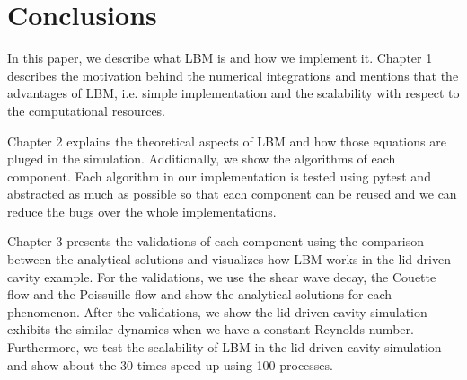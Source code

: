 \chapter{Conclusions}
In this paper, we describe what LBM is
and how we implement it.
Chapter 1 describes the motivation behind the numerical integrations
and mentions that the advantages of LBM, i.e.
simple implementation and the scalability with respect to the computational
resources.

Chapter 2 explains the theoretical aspects of LBM
and how those equations are pluged in the simulation.
Additionally, we show the algorithms of each component.
Each algorithm in our implementation
is tested using pytest and abstracted as much as possible
so that each component can be reused and we can reduce
the bugs over the whole implementations.

Chapter 3 presents the validations of each component
using the comparison between the analytical solutions
and visualizes how LBM works in the lid-driven cavity
example.
For the validations, we use the shear wave decay, 
the Couette flow and the Poissuille flow
and show the analytical solutions for each phenomenon.
After the validations, we show the lid-driven cavity simulation
exhibits the similar dynamics when we have a constant Reynolds number.
Furthermore, we test the scalability of 
LBM in the lid-driven cavity simulation
and show about the 30 times speed up using 100 processes.
